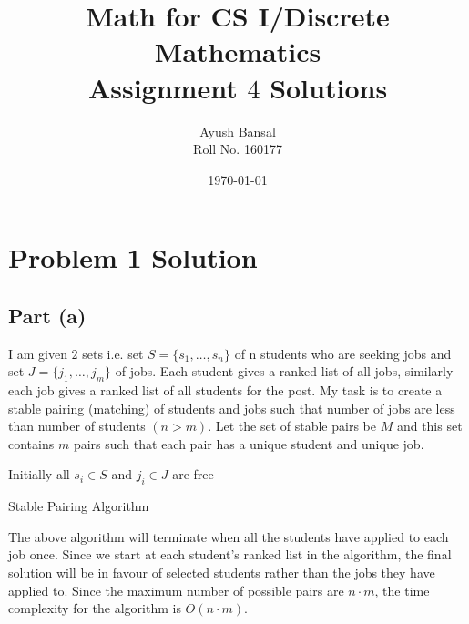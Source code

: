 \documentclass{article}
\title{\vspace{80mm}\lightgreyb Math for CS I/Discrete Mathematics \\
\lightgreyb Assignment $4$ Solutions}
\author{Ayush Bansal \\
Roll No. 160177}
\date{\today}
\begin{document}
\clearpage\maketitle
\thispagestyle{empty}
\newpage
\setcounter{page}{1}
\section{Problem 1 Solution}{
  \subsection{Part (a)}{
    I am given $2$ sets i.e. set $S=\{s_1,\dots,s_n\}$ of n students who are seeking jobs and set $J=\{j_1,\dots,j_m\}$ of jobs. \newline
    Each student gives a ranked list of all jobs, similarly each job gives a ranked list of all students for the post. \newline
    My task is to create a stable pairing (matching) of students and jobs such that number of jobs are less than number of students $(n>m)$. \newline
    Let the set of stable pairs be $M$ and this set contains $m$ pairs such that each pair has a unique student and unique job. \newline \newline
    \begin{algorithm}[H]
      Initially all $s_i \in S$ and $j_i \in J$ are free\;
      \caption{Stable Pairing Algorithm}
    \end{algorithm}
     The above algorithm will terminate when all the students have applied to each job once. \newline
     Since we start at each student's ranked list in the algorithm, the final solution will be in favour of selected students rather than the jobs they have applied to. \newline
    Since the maximum number of possible pairs are $n \cdot m$, the time complexity for the algorithm is $O(n \cdot m)$.
  }
  \newpage
}
\end{document}
